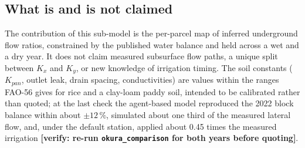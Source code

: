\documentclass{article}
\newcommand{\verify}[1]{{\color{orange!85!black}\textbf{[verify: #1]}}}
\begin{document}
\begin{added}
\subsection{What is and is not claimed}
The contribution of this sub-model is the per-parcel map of inferred underground flow ratios, constrained by the published water balance and held across a wet and a dry year. It does not claim measured subsurface flow paths, a unique split between $K_x$ and $K_y$, or new knowledge of irrigation timing. The soil constants ($K_{pan}$, outlet leak, drain spacing, conductivities) are values within the ranges FAO-56 gives for rice and a clay-loam paddy soil, intended to be calibrated rather than quoted; at the last check the agent-based model reproduced the 2022 block balance within about $\pm12\,\%$, simulated about one third of the measured lateral flow, and, under the default station, applied about 0.45 times the measured irrigation \verify{re-run \texttt{okura\_comparison} for both years before quoting}.
\end{added}

\end{document}
